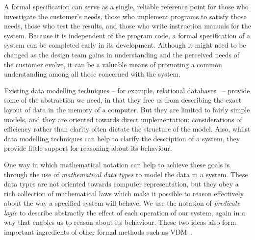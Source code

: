 \documentclass[12pt]{article}
\begin{document}
A formal specification can serve as a single, reliable reference point
for those who investigate the customer's needs, those who implement programs
to satisfy those needs, those who test the results, and those who write
instruction manuals for the system.
Because it is independent of the program code, a formal specification of
a system can be completed early in its development. Although it
might need to be changed as the design team gains in understanding and
the perceived needs of the customer evolve, it can be a valuable means
of promoting a common understanding among all those concerned with the
system.

Existing data modelling techniques -- for example,
relational databases~\cite{Date} -- provide some of the
abstraction we need, in that they free us from describing the
exact layout of data in the memory of a computer. But they
are limited to fairly simple models, and they are oriented
towards direct implementation: considerations of efficiency
rather than clarity often dictate the structure of the
model. Also, whilst data modelling techniques can help to
clarify the description of a system, they provide little
support for reasoning about its behaviour.

One way in which mathematical notation can help to achieve these
goals is through the use of {\em mathematical data types\/}
to model the data in a system. These data types
are not oriented towards computer representation, but they
obey a rich collection of mathematical laws which make it possible
to reason effectively about the way a specified system will
behave. We use the notation of {\em predicate logic\/} to
describe abstractly the effect of each operation of our
system, again in a way that enables us to reason about its
behaviour.
These two ideas also form important ingredients of other formal methods
such as VDM~\cite{Jones80,Jones86}.
\end{document}

